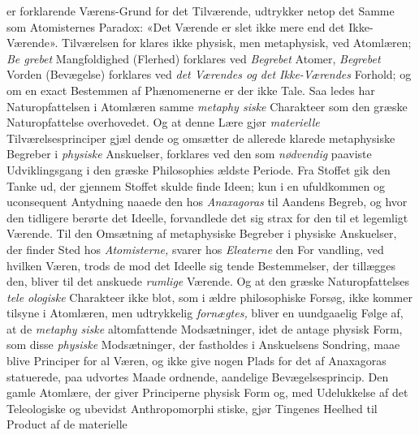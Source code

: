 er forklarende Værens-Grund for det Tilværende, udtrykker
netop det Samme som Atomisternes Paradox: «Det Værende
er slet ikke mere end det Ikke-Værende». Tilværelsen for\-%
klares ikke physisk, men metaphysisk, ved Atomlæren; \emph{Be\-%
grebet} Mangfoldighed (Flerhed) forklares ved \emph{Begrebet}
Atomer, \emph{Begrebet} Vorden (Bevægelse) forklares ved \emph{det
Værendes og det Ikke-Værendes} Forhold; og om en
exact Bestemmen af Phænomenerne er der ikke Tale. Saa\-%
ledes har Naturopfattelsen i Atomlæren samme \emph{metaphy\-%
siske} Charakteer som den græske Naturopfattelse overhovedet.
Og at denne Lære gjør \emph{materielle} Tilværelsesprinciper gjæl\-%
dende og omsætter de allerede klarede metaphysiske Begreber
i \emph{physiske} Anskuelser, forklares ved den som \emph{nødvendig}
paaviste Udviklingsgang i den græske Philosophies ældste
Periode. Fra Stoffet gik den Tanke ud, der gjennem Stoffet
skulde finde Ideen; kun i en ufuldkommen og uconsequent
Antydning naaede den hos \emph{Anaxagoras} til Aandens Begreb,
og hvor den tidligere berørte det Ideelle, forvandlede det sig
strax for den til et legemligt Værende. Til den Omsætning
af metaphysiske Begreber i physiske Anskuelser, der finder
Sted hos \emph{Atomisterne,} svarer hos \emph{Eleaterne} den For\-%
vandling, ved hvilken Væren, trods de mod det Ideelle sig\-%
tende Bestemmelser, der tillægges den, bliver til det anskuede
\emph{rumlige} Værende. Og at den græske Naturopfattelses \emph{tele\-%
ologiske} Charakteer ikke blot, som i ældre philosophiske
Forsøg, ikke kommer tilsyne i Atomlæren, men udtrykkelig
\emph{fornægtes,} bliver en uundgaaelig Følge af, at de \emph{metaphy\-%
siske} altomfattende Modsætninger, idet de antage physisk
Form, som disse \emph{physiske} Modsætninger, der fastholdes i
Anskuelsens Sondring, maae blive Principer for al Væren, og
ikke give nogen Plads for det af Anaxagoras statuerede, paa
udvortes Maade ordnende, aandelige Bevægelsesprincip. Den
gamle Atomlære, der giver Principerne physisk Form og, med
Udelukkelse af det Teleologiske og ubevidst Anthropomorphi\-%
stiske, gjør Tingenes Heelhed til Product af de materielle
